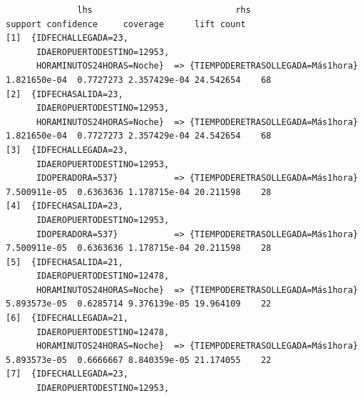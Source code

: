 \documentclass{article}
\begin{document}
\begin{lstlisting}
              lhs                            rhs                                    support confidence     coverage      lift count
[1]  {IDFECHALLEGADA=23,                                                                                                  
      IDAEROPUERTODESTINO=12953,                                                                                          
      HORAMINUTOS24HORAS=Noche}  => {TIEMPODERETRASOLLEGADA=Más1hora} 1.821650e-04  0.7727273 2.357429e-04 24.542654    68
[2]  {IDFECHASALIDA=23,                                                                                                   
      IDAEROPUERTODESTINO=12953,                                                                                          
      HORAMINUTOS24HORAS=Noche}  => {TIEMPODERETRASOLLEGADA=Más1hora} 1.821650e-04  0.7727273 2.357429e-04 24.542654    68
[3]  {IDFECHALLEGADA=23,                                                                                                  
      IDAEROPUERTODESTINO=12953,                                                                                          
      IDOPERADORA=537}           => {TIEMPODERETRASOLLEGADA=Más1hora} 7.500911e-05  0.6363636 1.178715e-04 20.211598    28
[4]  {IDFECHASALIDA=23,                                                                                                   
      IDAEROPUERTODESTINO=12953,                                                                                          
      IDOPERADORA=537}           => {TIEMPODERETRASOLLEGADA=Más1hora} 7.500911e-05  0.6363636 1.178715e-04 20.211598    28
[5]  {IDFECHASALIDA=21,                                                                                                   
      IDAEROPUERTODESTINO=12478,                                                                                          
      HORAMINUTOS24HORAS=Noche}  => {TIEMPODERETRASOLLEGADA=Más1hora} 5.893573e-05  0.6285714 9.376139e-05 19.964109    22
[6]  {IDFECHALLEGADA=21,                                                                                                  
      IDAEROPUERTODESTINO=12478,                                                                                          
      HORAMINUTOS24HORAS=Noche}  => {TIEMPODERETRASOLLEGADA=Más1hora} 5.893573e-05  0.6666667 8.840359e-05 21.174055    22
[7]  {IDFECHALLEGADA=23,                                                                                                  
      IDAEROPUERTODESTINO=12953,                                                                                          

\end{lstlisting}
\end{document}
